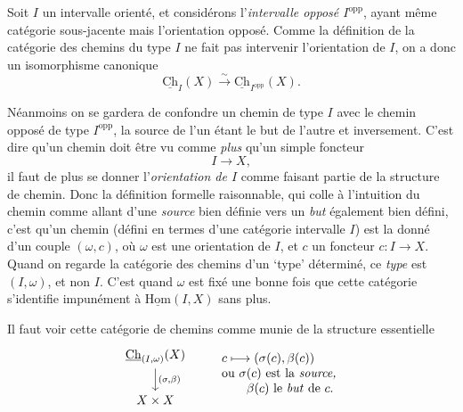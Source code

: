 \documentclass[11pt]{article}
\newcommand{\printedpage}[1]{\marginpar{\footnotesize p.~#1}}
\newcommand{\msp}[1]{\marginpar{\footnotesize [#1]}}
\newcommand{\Ch}{\underline{\mathrm{Ch}}}
\newcommand{\uHom}{\underline{\mathrm{Hom}}}
\newcommand{\opp}{\mathrm{opp}}
\begin{document}
Soit $I$ un intervalle orienté, et considérons l'\textit{intervalle opposé $I^{\opp}$}, ayant même catégorie sous-jacente mais l'orientation opposé. Comme la définition de la catégorie des chemins du type $I$ ne fait pas intervenir l'orientation de $I$, on a donc un isomorphisme canonique %
\[
\Ch_I(X) \xrightarrow{\sim} \Ch_{I^{\opp}}(X).
\]

\msp{page 17}

Néanmoins on se gardera de confondre un chemin de type $I$ avec le chemin opposé de type $I^{\opp}$, la source de l'un étant le but de l'autre et inversement. C'est dire qu'un chemin doit être vu comme \textit{plus} qu'un simple foncteur
\[
I \longrightarrow X,
\]
il faut de plus se donner l'\textit{orientation de $I$} comme faisant partie de la structure de chemin. Donc la définition formelle raisonnable, qui colle à l'intuition du chemin comme allant d'une \textit{source} bien définie vers un \textit{but} également bien défini, c'est qu'un chemin (défini en termes d'une catégorie intervalle $I$) est la donné d'un couple $(\omega,c)$, où $\omega$ est une orientation de $I$, et $c$ un foncteur $c : I \longrightarrow X$. Quand on regarde la catégorie des chemins d'un `type' déterminé, ce \textit{type} est $(I,\omega)$, et non $I$. C'est quand $\omega$ est fixé une bonne fois que cette catégorie s'identifie impunément à $\uHom(I,X)$ sans plus. %

Il faut voir cette catégorie de chemins comme munie de la structure essentielle
\[
\begin{tikzcd}
\Ch_{(I,\omega)}(X) \arrow[d, "{(\sigma,\beta)}"] \\
X \times X
\end{tikzcd}
\qquad
\begin{array}{l}
c \longmapsto (\sigma(c),\beta(c)) \\
\text{ou $\sigma(c)$ est la \textit{source,}} \\
\qquad \text{$\beta(c)$ le \textit{but} de $c$.}
\end{array} %
\]

\printedpage{12}

\msp{page 18}
\end{document}
